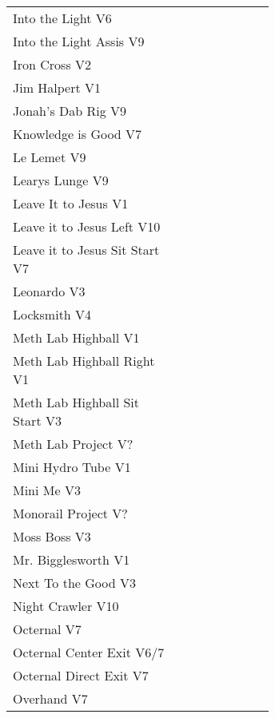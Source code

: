 \begin{flushleft}
\begin{center}
\begin{supertabular}{p{0.65\linewidth}r}
Into the Light V6 & \pageref{rt:Into the Light} \\
Into the Light Assis V9 & \pageref{vr:Into the Light Assis} \\
Iron Cross V2 & \pageref{vr:Iron Cross} \\
Jim Halpert V1 & \pageref{rt:Jim Halpert} \\
Jonah's Dab Rig V9 & \pageref{rt:Jonah's Dab Rig} \\
Knowledge is Good V7 & \pageref{rt:Knowledge is Good} \\
Le Lemet V9 & \pageref{rt:Le Lemet} \\
Learys Lunge V9 & \pageref{vr:Learys Lunge} \\
Leave It to Jesus V1 & \pageref{rt:Leave It to Jesus} \\
Leave it to Jesus Left V10 & \pageref{vr:Leave it to Jesus Left} \\
Leave it to Jesus Sit Start V7 & \pageref{vr:Leave it to Jesus Sit Start} \\
Leonardo V3 & \pageref{rt:Leonardo} \\
Locksmith V4 & \pageref{rt:Locksmith} \\
Meth Lab Highball V1 & \pageref{rt:Meth Lab Highball} \\
Meth Lab Highball Right V1 & \pageref{rt:Meth Lab Highball Right} \\
Meth Lab Highball Sit Start V3 & \pageref{vr:Meth Lab Highball Sit Start} \\
Meth Lab Project V? & \pageref{rt:Meth Lab Project} \\
Mini Hydro Tube V1 & \pageref{rt:Mini Hydro Tube} \\
Mini Me V3 & \pageref{rt:Mini Me} \\
Monorail Project V? & \pageref{rt:Monorail Project} \\
Moss Boss V3 & \pageref{rt:Moss Boss} \\
Mr. Bigglesworth V1 & \pageref{vr:Mr. Bigglesworth} \\
Next To the Good V3 & \pageref{rt:Next To the Good} \\
Night Crawler V10 & \pageref{rt:Night Crawler} \\
Octernal V7 & \pageref{rt:Octernal} \\
Octernal Center Exit V6/7 & \pageref{vr:Octernal Center Exit} \\
Octernal Direct Exit V7 & \pageref{vr:Octernal Direct Exit} \\
Overhand V7 & \pageref{rt:Overhand} \\

\end{supertabular}
\end{center}
\end{flushleft}
